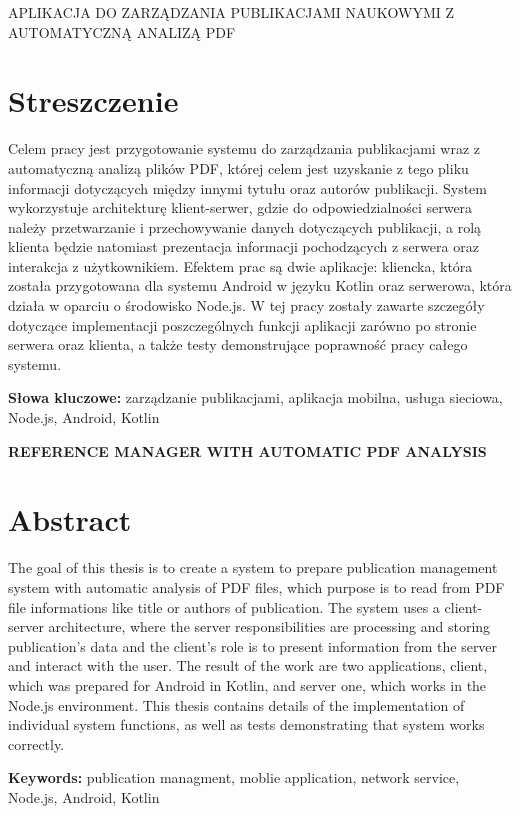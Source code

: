 \newpage
\begin{center}
\large \bf

APLIKACJA DO ZARZĄDZANIA PUBLIKACJAMI NAUKOWYMI Z AUTOMATYCZNĄ ANALIZĄ PDF
\end{center}

\section*{Streszczenie}
Celem pracy jest przygotowanie systemu do zarządzania publikacjami wraz z automatyczną analizą plików PDF, której celem jest uzyskanie z tego pliku informacji dotyczących między innymi tytułu oraz autorów publikacji. System wykorzystuje architekturę klient-serwer, gdzie do odpowiedzialności serwera należy przetwarzanie i przechowywanie danych dotyczących publikacji, a rolą klienta będzie natomiast prezentacja informacji pochodzących z serwera oraz interakcja z użytkownikiem. Efektem prac są dwie aplikacje:
kliencka, która została przygotowana dla systemu Android w języku Kotlin oraz serwerowa, która działa w oparciu o środowisko Node.js. W tej pracy zostały zawarte szczegóły dotyczące implementacji poszczególnych funkcji aplikacji zarówno po stronie serwera oraz klienta, a także testy demonstrujące poprawność pracy całego systemu. 



\bigskip
{\noindent\bf Słowa kluczowe:} zarządzanie publikacjami, aplikacja mobilna, usługa sieciowa, Node.js, Android, Kotlin

\vskip 1cm


\begin{center}
\large \bf
\uppercase{Reference manager with automatic PDF analysis}
\end{center}

\section*{Abstract}
The goal of this thesis is to create a system to prepare publication management system with automatic analysis of PDF files, which purpose is to read from PDF file informations like title or authors of publication. The system uses a client-server architecture, where the server responsibilities are processing and storing publication's data and the client's role is to present information from the server and interact with the user. The result of the work are two applications,
client, which was prepared for Android in Kotlin, and server one, which works in the Node.js environment. This thesis contains details of the implementation of individual system functions, as well as tests demonstrating that system works correctly. 

\bigskip
{\noindent\bf Keywords:} publication managment, moblie application, 
network service, Node.js, Android, Kotlin

\vfill